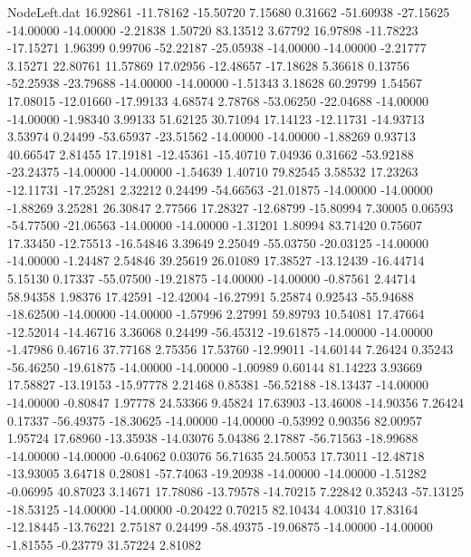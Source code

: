 \begin{filecontents}{NodeLeft.dat}
  16.92861  -11.78162  -15.50720     7.15680    0.31662  -51.60938  -27.15625  -14.00000  -14.00000   -2.21838    1.50720   83.13512    3.67792
  16.97898  -11.78223  -17.15271     1.96399    0.99706  -52.22187  -25.05938  -14.00000  -14.00000   -2.21777    3.15271   22.80761   11.57869
  17.02956  -12.48657  -17.18628     5.36618    0.13756  -52.25938  -23.79688  -14.00000  -14.00000   -1.51343    3.18628   60.29799    1.54567
  17.08015  -12.01660  -17.99133     4.68574    2.78768  -53.06250  -22.04688  -14.00000  -14.00000   -1.98340    3.99133   51.62125   30.71094
  17.14123  -12.11731  -14.93713     3.53974    0.24499  -53.65937  -23.51562  -14.00000  -14.00000   -1.88269    0.93713   40.66547    2.81455
  17.19181  -12.45361  -15.40710     7.04936    0.31662  -53.92188  -23.24375  -14.00000  -14.00000   -1.54639    1.40710   79.82545    3.58532
  17.23263  -12.11731  -17.25281     2.32212    0.24499  -54.66563  -21.01875  -14.00000  -14.00000   -1.88269    3.25281   26.30847    2.77566
  17.28327  -12.68799  -15.80994     7.30005    0.06593  -54.77500  -21.06563  -14.00000  -14.00000   -1.31201    1.80994   83.71420    0.75607
  17.33450  -12.75513  -16.54846     3.39649    2.25049  -55.03750  -20.03125  -14.00000  -14.00000   -1.24487    2.54846   39.25619   26.01089
  17.38527  -13.12439  -16.44714     5.15130    0.17337  -55.07500  -19.21875  -14.00000  -14.00000   -0.87561    2.44714   58.94358    1.98376
  17.42591  -12.42004  -16.27991     5.25874    0.92543  -55.94688  -18.62500  -14.00000  -14.00000   -1.57996    2.27991   59.89793   10.54081
  17.47664  -12.52014  -14.46716     3.36068    0.24499  -56.45312  -19.61875  -14.00000  -14.00000   -1.47986    0.46716   37.77168    2.75356
  17.53760  -12.99011  -14.60144     7.26424    0.35243  -56.46250  -19.61875  -14.00000  -14.00000   -1.00989    0.60144   81.14223    3.93669
  17.58827  -13.19153  -15.97778     2.21468    0.85381  -56.52188  -18.13437  -14.00000  -14.00000   -0.80847    1.97778   24.53366    9.45824
  17.63903  -13.46008  -14.90356     7.26424    0.17337  -56.49375  -18.30625  -14.00000  -14.00000   -0.53992    0.90356   82.00957    1.95724
  17.68960  -13.35938  -14.03076     5.04386    2.17887  -56.71563  -18.99688  -14.00000  -14.00000   -0.64062    0.03076   56.71635   24.50053
  17.73011  -12.48718  -13.93005     3.64718    0.28081  -57.74063  -19.20938  -14.00000  -14.00000   -1.51282   -0.06995   40.87023    3.14671
  17.78086  -13.79578  -14.70215     7.22842    0.35243  -57.13125  -18.53125  -14.00000  -14.00000   -0.20422    0.70215   82.10434    4.00310
  17.83164  -12.18445  -13.76221     2.75187    0.24499  -58.49375  -19.06875  -14.00000  -14.00000   -1.81555   -0.23779   31.57224    2.81082

\end{filecontents}
